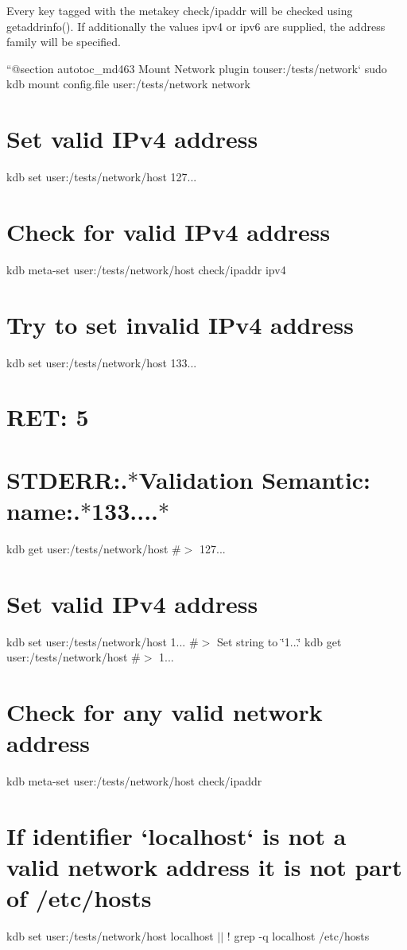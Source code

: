 Every key tagged with the metakey {\ttfamily check/ipaddr} will be checked using {\ttfamily getaddrinfo()}. If additionally the values {\ttfamily ipv4} or {\ttfamily ipv6} are supplied, the address family will be specified.

``{\ttfamily  @section autotoc\+\_\+md463 Mount Network plugin to}user\+:/tests/network` sudo kdb mount config.\+file user\+:/tests/network network\hypertarget{autotoc_md459_autotoc_md464}{}\section{Set valid I\+Pv4 address}\label{autotoc_md459_autotoc_md464}
kdb set user\+:/tests/network/host 127... \hypertarget{autotoc_md459_autotoc_md465}{}\section{Check for valid I\+Pv4 address}\label{autotoc_md459_autotoc_md465}
kdb meta-\/set user\+:/tests/network/host check/ipaddr ipv4\hypertarget{autotoc_md459_autotoc_md466}{}\section{Try to set invalid I\+Pv4 address}\label{autotoc_md459_autotoc_md466}
kdb set user\+:/tests/network/host 133... \hypertarget{autotoc_md459_autotoc_md467}{}\section{R\+E\+T\+: 5}\label{autotoc_md459_autotoc_md467}
\hypertarget{autotoc_md459_autotoc_md468}{}\section{S\+T\+D\+E\+R\+R\+:.$\ast$\+Validation Semantic\+: name\+:.$\ast$133....$\ast$}\label{autotoc_md459_autotoc_md468}
kdb get user\+:/tests/network/host \#$>$ 127...\hypertarget{autotoc_md459_autotoc_md469}{}\section{Set valid I\+Pv4 address}\label{autotoc_md459_autotoc_md469}
kdb set user\+:/tests/network/host 1... \#$>$ Set string to \char`\"{}1...\char`\"{} kdb get user\+:/tests/network/host \#$>$ 1...\hypertarget{autotoc_md459_autotoc_md470}{}\section{Check for any valid network address}\label{autotoc_md459_autotoc_md470}
kdb meta-\/set user\+:/tests/network/host check/ipaddr \textquotesingle{}\textquotesingle{} \hypertarget{autotoc_md459_autotoc_md471}{}\section{If identifier `localhost` is not a valid network address it is not part of /etc/hosts}\label{autotoc_md459_autotoc_md471}
kdb set user\+:/tests/network/host localhost $\vert$$\vert$ ! grep -\/q localhost /etc/hosts

